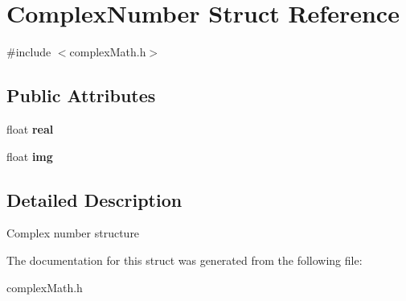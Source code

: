 \hypertarget{structComplexNumber}{}\section{Complex\+Number Struct Reference}
\label{structComplexNumber}


{\ttfamily \#include $<$complex\+Math.\+h$>$}

\subsection*{Public Attributes}
{\bf }\par
\begin{DoxyCompactItemize}
\item 
float {\bfseries real}\hypertarget{structComplexNumber_a19ded39d7e9f32f1572d13406b5e07ed}{}\label{structComplexNumber_a19ded39d7e9f32f1572d13406b5e07ed}

\item 
float {\bfseries img}\hypertarget{structComplexNumber_aee2a3e161e996b5301691844b1b8f3d2}{}\label{structComplexNumber_aee2a3e161e996b5301691844b1b8f3d2}

\end{DoxyCompactItemize}



\subsection{Detailed Description}
Complex number structure 

The documentation for this struct was generated from the following file\+:\begin{DoxyCompactItemize}
\item 
complex\+Math.\+h\end{DoxyCompactItemize}
